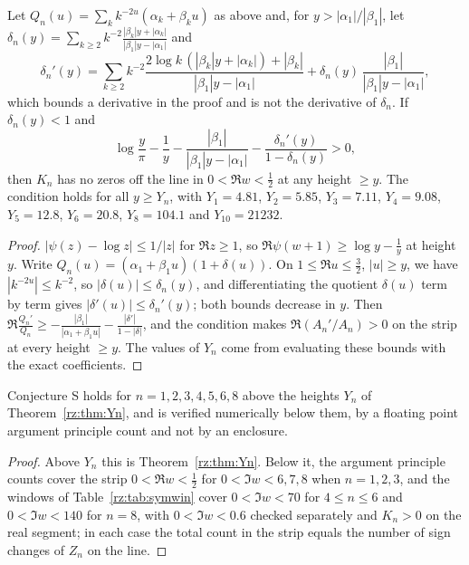 \begin{theorem}\label{rz:thm:Yn}
Let $Q_n(u)=\sum_kk^{-2u}(\alpha_k+\beta_ku)$ as above and, for $y>|\alpha_1|/|\beta_1|$, let $\delta_n(y)=\sum_{k\ge2}k^{-2}\frac{|\beta_k|y+|\alpha_k|}{|\beta_1|y-|\alpha_1|}$ and
\[
\delta_n'(y)=\sum_{k\ge2}k^{-2}\frac{2\log k\,(|\beta_k|y+|\alpha_k|)+|\beta_k|}{|\beta_1|y-|\alpha_1|}+\delta_n(y)\,\frac{|\beta_1|}{|\beta_1|y-|\alpha_1|},
\]
which bounds a derivative in the proof and is not the derivative of $\delta_n$. If $\delta_n(y)<1$ and
\[
\log\frac y\pi-\frac1y-\frac{|\beta_1|}{|\beta_1|y-|\alpha_1|}-\frac{\delta_n'(y)}{1-\delta_n(y)}>0,
\]
then $K_n$ has no zeros off the line in $0<\Re w<\frac12$ at any height $\ge y$. The condition holds for all $y\ge Y_n$, with $Y_1=4.81$, $Y_2=5.85$, $Y_3=7.11$, $Y_4=9.08$, $Y_5=12.8$, $Y_6=20.8$, $Y_8=104.1$ and $Y_{10}=21232$.
\end{theorem}

\begin{proof}
$|\psi(z)-\log z|\le1/|z|$ for $\Re z\ge1$, so $\Re\psi(w+1)\ge\log y-\frac1y$ at height $y$. Write $Q_n(u)=(\alpha_1+\beta_1u)(1+\delta(u))$. On $1\le\Re u\le\frac32$, $|u|\ge y$, we have $|k^{-2u}|\le k^{-2}$, so $|\delta(u)|\le\delta_n(y)$, and differentiating the quotient $\delta(u)$ term by term gives $|\delta'(u)|\le\delta_n'(y)$; both bounds decrease in $y$. Then $\Re\frac{Q_n'}{Q_n}\ge-\frac{|\beta_1|}{|\alpha_1+\beta_1u|}-\frac{|\delta'|}{1-|\delta|}$, and the condition makes $\Re(A_n'/A_n)>0$ on the strip at every height $\ge y$. The values of $Y_n$ come from evaluating these bounds with the exact coefficients.
\end{proof}

\begin{corollary}\label{rz:cor:Ssmall}
Conjecture S holds for $n=1,2,3,4,5,6,8$ above the heights $Y_n$ of Theorem~\ref{rz:thm:Yn}, and is verified numerically below them, by a floating point argument principle count and not by an enclosure.
\end{corollary}

\begin{proof}
Above $Y_n$ this is Theorem~\ref{rz:thm:Yn}. Below it, the argument principle counts cover the strip $0<\Re w<\frac12$ for $0<\Im w<6,7,8$ when $n=1,2,3$, and the windows of Table~\ref{rz:tab:symwin} cover $0<\Im w<70$ for $4\le n\le6$ and $0<\Im w<140$ for $n=8$, with $0<\Im w<0.6$ checked separately and $K_n>0$ on the real segment; in each case the total count in the strip equals the number of sign changes of $Z_n$ on the line.
\end{proof}

